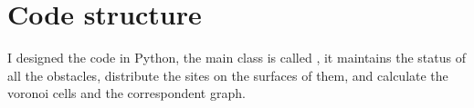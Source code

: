 \documentclass[dissertation.tex]{subfiles}
\begin{document}
\chapter{Code structure}
I designed the code in Python, the main class is called
, it maintains the status of all the obstacles,
distribute the sites on the surfaces of them, and calculate the
voronoi cells and the correspondent graph.
\end{document}
